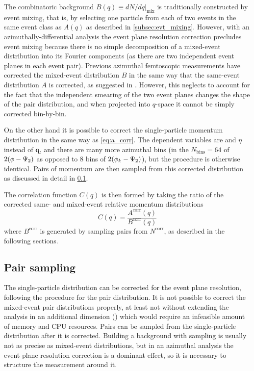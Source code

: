 The combinatoric background $B(q) \equiv \left. dN/dq \right|_{\textrm{mix}}$ is traditionally constructed by event mixing, that is, by selecting one particle from each of two events in the same event class as $A(q)$ as described in \cref{subsec:evt_mixing}.
However, with an azimuthally-differential analysis the event plane resolution correction precludes event mixing because there is no simple decomposition of a mixed-event distribution into its Fourier components (as there are two independent event planes in each event pair).
Previous azimuthal femtoscopic measurements have corrected the mixed-event distribution $B$ in the same way that the same-event distribution $A$ is corrected, as suggested in .
However, this neglects to account for the fact that the independent smearing of the two event planes changes the shape of the pair distribution, and when projected into $q$-space it cannot be simply corrected bin-by-bin.

On the other hand it is possible to correct the single-particle momentum distribution in the same way as \cref{eq:a_corr}.
The dependent variables are \pt and $\eta$ instead of $\mathbf{q}$, and there are many more azimuthal bins (in \Eqn{\ref{eq:xi_def}} the $N_\textrm{bins} = 64$ of $2(\phi - \Psi_{2})$ as opposed to 8 bins of $2(\phi_{k} - \Psi_{2})$), but the procedure is otherwise identical.
Pairs of momentum are then sampled from this corrected distribution as discussed in detail in \cref{subsec:bkgd_sampling}.

The correlation function $C(q)$ is then formed by taking the ratio of the corrected same- and mixed-event relative momentum distributions
\begin{equation}
  C(q) = \frac{A^\textrm{corr}(q)}{B^\textrm{corr}(q)}
\end{equation}
where $B^\textrm{corr}$ is generated by sampling pairs from $N^\textrm{corr}$, as described in the following sections.

\subsection{Pair sampling}
\label{subsec:bkgd_sampling}
The single-particle distribution can be corrected for the event plane resolution, following the procedure for the pair distribution.
It is not possible to correct the mixed-event pair distributions properly, at least not without extending the analysis in an additional dimension (\psit) which would require an infeasible amount of memory and CPU resources.
Pairs can be sampled from the single-particle distribution after it is corrected.
Building a background with sampling is usually not as precise as mixed-event distributions, but in an azimuthal analysis the event plane resolution correction is a dominant effect, so it is necessary to structure the measurement around it.

